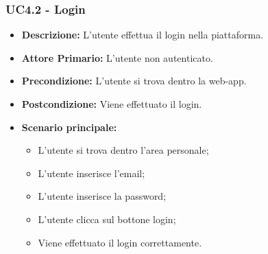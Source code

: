 \subsubsection{UC4.2 - Login}
\begin{itemize}
    \item \textbf{Descrizione:} L'utente effettua il login nella piattaforma.
    \item \textbf{Attore Primario:} L'utente non autenticato.
    \item \textbf{Precondizione:} L'utente si trova dentro la web-app.
    \item \textbf{Postcondizione:} Viene effettuato il login.
    \item \textbf{Scenario principale:}
    \begin{itemize}
        \item L'utente si trova dentro l'area personale;
        \item L'utente inserisce l'email;
        \item L'utente inserisce la password;
        \item L'utente clicca sul bottone login;
        \item Viene effettuato il login correttamente.
    \end{itemize}
\end{itemize}
